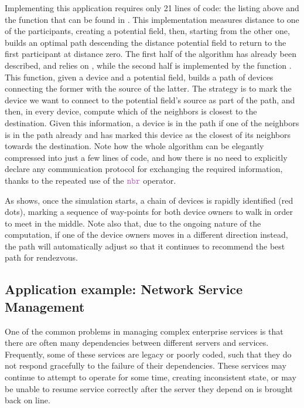 \documentclass[12pt,a4paper,twoside,openright]{book}
\begin{document}
Implementing this application requires only 21 lines of code: the listing above and the function \texttt{} that can be found in .
%
This implementation measures distance to one of the participants, creating a potential field, then, starting from the other one, builds an optimal path descending the distance potential field to return to the first participant at distance zero.
%
The first half of the algorithm has already been described, and relies on \texttt{}, while the second half is implemented by the function \texttt{}.
%
This function, given a device and a potential field, builds a path of devices connecting the former with the source of the latter.
%
The strategy is to mark the device we want to connect to the potential field's source as part of the path, and then, in every device, compute which of the neighbors is closest to the destination.
%
Given this information, a device is in the path if one of the neighbors is in the path already and has marked this device as the closest of its neighbors towards the destination.
%
Note how the whole algorithm can be elegantly compressed into just a few lines of code, and how there is no need to explicitly declare any communication protocol for exchanging the required information, thanks to the repeated use of the $\nbrK$ operator.

As  shows, once the simulation starts, a chain of devices is rapidly identified (red dots), marking a sequence of way-points for both device owners to walk in order to meet in the middle.
%
Note also that, due to the ongoing nature of the computation, if one of the device owners moves in a different direction instead, the path will automatically adjust so that it continues to recommend the best path for rendezvous.

\subsection{Application example: Network Service Management}
\label{protelis-network-service}

One of the common problems in managing complex enterprise services is that there are often many dependencies between different servers and services.
%
Frequently, some of these services are legacy or poorly coded, such that they do not respond gracefully to the failure of their dependencies.  These services may continue to attempt to operate for some time, creating inconsistent state, or may be unable to resume service correctly after the server they depend on is brought back on line.
\end{document}
